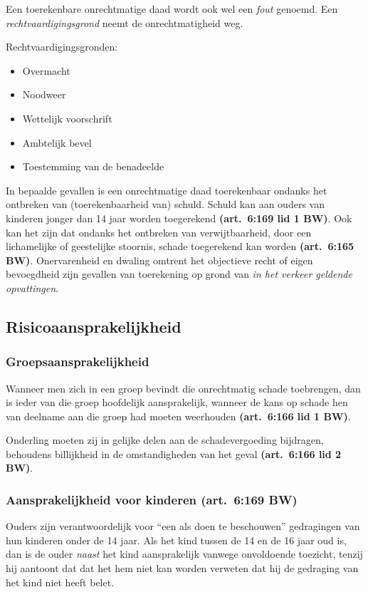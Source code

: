 \documentclass[a4paper]{article}
\newcommand{\art}[1]{\textbf{(art.~#1 BW)}\xspace}
\begin{document}
Een toerekenbare onrechtmatige daad wordt ook wel een \emph{fout} genoemd. Een
\emph{rechtvaardigingsgrond} neemt de onrechtmatigheid weg.

Rechtvaardigingsgronden:
\begin{itemize}
  \item Overmacht
  \item Noodweer
  \item Wettelijk voorschrift
  \item Ambtelijk bevel
  \item Toestemming van de benadeelde
\end{itemize}

In bepaalde gevallen is een onrechtmatige daad toerekenbaar ondanks het
ontbreken van (toerekenbaarheid van) schuld. Schuld kan aan ouders van
kinderen jonger dan 14 jaar worden toegerekend \art{6:169 lid 1}. Ook kan het
zijn dat ondanks het ontbreken van verwijtbaarheid, door een lichamelijke of
geestelijke stoornis, schade toegerekend kan worden \art{6:165}. Onervarenheid
en dwaling omtrent het objectieve recht of eigen bevoegdheid zijn gevallen van
toerekening op grond van \emph{in het verkeer geldende opvattingen}.

\subsection{Risicoaansprakelijkheid}

\subsubsection{Groepsaansprakelijkheid}

Wanneer men zich in een groep bevindt die onrechtmatig schade toebrengen, dan
is ieder van die groep hoofdelijk aansprakelijk, wanneer de kans op schade hen
van deelname aan die groep had moeten weerhouden \art{6:166 lid 1}.

Onderling moeten zij in gelijke delen aan de schadevergoeding bijdragen,
behoudens billijkheid in de omstandigheden van het geval \art{6:166 lid 2}.


\subsubsection{Aansprakelijkheid voor kinderen \art{6:169}}

Ouders zijn verantwoordelijk voor ``een als doen te beschouwen'' gedragingen
van hun kinderen onder de 14 jaar. Als het kind tussen de 14 en de 16 jaar oud
is, dan is de ouder \emph{naast} het kind aansprakelijk vanwege onvoldoende
toezicht, tenzij hij aantoont dat dat het hem niet kan worden verweten dat hij
de gedraging van het kind niet heeft belet.
\end{document}
